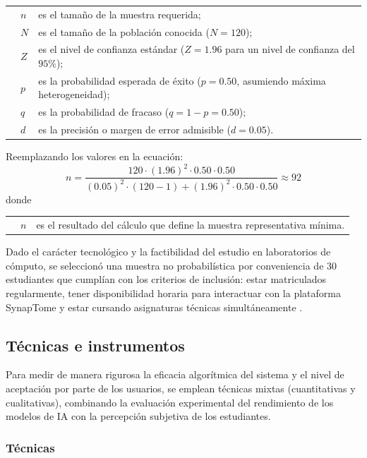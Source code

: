 \noindent\begin{tabular}{@{} p{1cm} l p{8.0cm} @{}}
  & $n$ & es el tamaño de la muestra requerida; \\
  & $N$ & es el tamaño de la población conocida ($N = 120$); \\
  & $Z$ & es el nivel de confianza estándar ($Z = 1.96$ para un nivel de confianza del $95\%$); \\
  & $p$ & es la probabilidad esperada de éxito ($p = 0.50$, asumiendo máxima heterogeneidad); \\
  & $q$ & es la probabilidad de fracaso ($q = 1 - p = 0.50$); \\
  & $d$ & es la precisión o margen de error admisible ($d = 0.05$).
\end{tabular}

Reemplazando los valores en la ecuación:
\begin{equation}
n = \frac{120 \cdot (1.96)^2 \cdot 0.50 \cdot 0.50}{(0.05)^2 \cdot (120 - 1) + (1.96)^2 \cdot 0.50 \cdot 0.50} \approx 92
\end{equation}
\noindent donde

\noindent\begin{tabular}{@{} p{1cm} l p{8.0cm} @{}}
  & $n$ & es el resultado del cálculo que define la muestra representativa mínima.
\end{tabular}

Dado el carácter tecnológico y la factibilidad del estudio en laboratorios de cómputo, se seleccionó una muestra no probabilística por conveniencia de 30 estudiantes que cumplían con los criterios de inclusión: estar matriculados regularmente, tener disponibilidad horaria para interactuar con la plataforma SynapTome y estar cursando asignaturas técnicas simultáneamente \parencite{Kreijkes2026}.

\subsection{Técnicas e instrumentos}

Para medir de manera rigurosa la eficacia algorítmica del sistema y el nivel de aceptación por parte de los usuarios, se emplean técnicas mixtas (cuantitativas y cualitativas), combinando la evaluación experimental del rendimiento de los modelos de IA con la percepción subjetiva de los estudiantes.

\subsubsection{Técnicas}

